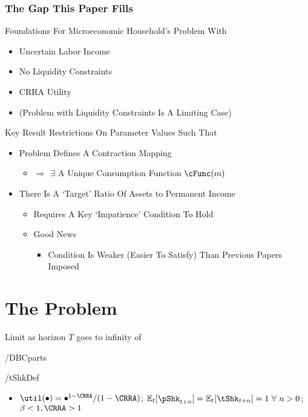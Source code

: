 \documentclass[pdflatex]{beamer}
\providecommand{\Ex}{\mathbb{E}}
\begin{document}
\begin{frame}
\frametitle{The Gap This Paper Fills}

\pause Foundations For Microeconomic Household's Problem With
\begin{itemize}
\item Uncertain Labor Income
\item No Liquidity Constraints
\item CRRA Utility
\item (Problem with Liquidity Constraints Is A Limiting Case)
\end{itemize}

\end{frame}
\begin{frame}{Key Result}
\pause
Restrictions On Parameter Values Such That \pause
\begin{itemize}
\item Problem Defines A Contraction Mapping
\begin{itemize}
\item $\Rightarrow~~\exists $ A Unique Consumption Function $\cFunc(m)$
\end{itemize}
\item There Is A `Target' Ratio Of Assets to Permanent Income
\begin{itemize}
\item Requires A Key `Impatience' Condition To Hold
\item Good News
\begin{itemize} \item Condition Is Weaker (Easier To Satisfy) Than Previous Papers Imposed \end{itemize}
\end{itemize}
\end{itemize}

\end{frame}

\section{The Problem}

\begin{frame}

Limit as horizon $T$ goes to infinity of 

 \LtxDir\EqDir/DBCparts

 \LtxDir\EqDir/tShkDef

\begin{itemize}
\item $\util(\bullet)=\bullet^{1-\CRRA}/(1-\CRRA)$; $\Ex_{t}[\pShk_{t+n}]=\Ex_{t}[\tShk_{t+n}]=1~\forall~n>0$; $\beta < 1, \CRRA > 1$
\end{itemize}

\end{frame}
\end{document}
